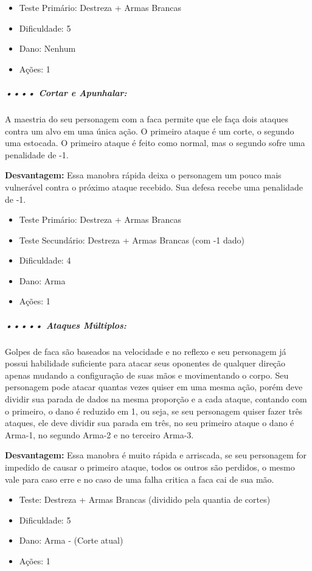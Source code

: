 \begin{itemize}[noitemsep]
\item Teste Primário: Destreza + Armas Brancas
\item Dificuldade: 5
\item Dano: Nenhum
\item Ações: 1
\end{itemize}

\subparagraph{\bf •••• Cortar e Apunhalar:}
A maestria do seu personagem com a faca permite que ele faça dois ataques contra um alvo em uma única ação. O primeiro ataque é um corte, o segundo uma estocada. O primeiro ataque é feito como
normal, mas o segundo sofre uma penalidade de -1. 

{\bf Desvantagem:} Essa manobra rápida deixa o personagem um pouco
mais vulnerável contra o próximo ataque recebido. Sua defesa recebe uma penalidade de -1.

\begin{itemize}[noitemsep]
\item Teste Primário: Destreza + Armas Brancas
\item Teste Secundário: Destreza + Armas Brancas (com -1 dado)
\item Dificuldade: 4
\item Dano: Arma
\item Ações: 1
\end{itemize}

\subparagraph{\bf ••••• Ataques Múltiplos:}
Golpes de faca são baseados na velocidade e no reflexo e seu personagem já possui habilidade suficiente para atacar seus oponentes de qualquer direção apenas mudando a configuração de suas mãos e movimentando o corpo. Seu personagem pode atacar quantas vezes quiser em uma mesma ação, porém deve dividir sua parada de dados na mesma proporção e a cada ataque, contando com o primeiro, o dano é reduzido em 1, ou seja, se seu personagem quiser fazer três ataques, ele deve dividir sua parada em três, no seu primeiro ataque o dano é Arma-1, no segundo Arma-2 e no terceiro Arma-3.

{\bf Desvantagem:} Essa manobra é muito rápida e arriscada, se seu personagem for impedido de causar o primeiro ataque, todos os outros são perdidos, o mesmo vale para caso erre e no caso de uma falha critica a faca cai de sua mão.

\begin{itemize}[noitemsep]
\item Teste: Destreza + Armas Brancas (dividido pela quantia de cortes)
\item Dificuldade: 5
\item Dano: Arma - (Corte atual)
\item Ações: 1
\end{itemize}